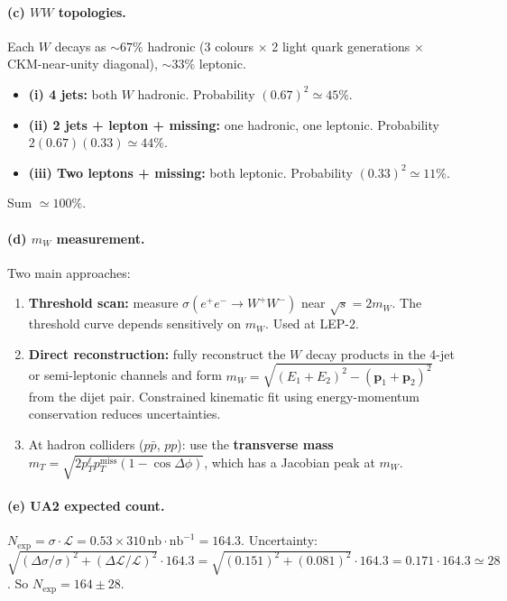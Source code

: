 \documentclass[11pt]{article}
\begin{document}
\paragraph{(c) $WW$ topologies.} Each $W$ decays as $\sim 67\%$ hadronic (3 colours $\times$ 2 light quark generations $\times$ CKM-near-unity diagonal), $\sim 33\%$ leptonic.

\begin{itemize}[itemsep=1pt]
\item \textbf{(i) 4 jets:} both $W$ hadronic. Probability $(0.67)^{2}\simeq 45\%$.
\item \textbf{(ii) 2 jets + lepton + missing:} one hadronic, one leptonic. Probability $2(0.67)(0.33)\simeq 44\%$.
\item \textbf{(iii) Two leptons + missing:} both leptonic. Probability $(0.33)^{2}\simeq 11\%$.
\end{itemize}
Sum $\simeq 100\%$. \checkmark

\paragraph{(d) $m_W$ measurement.} Two main approaches:
\begin{enumerate}[itemsep=1pt]
\item \textbf{Threshold scan:} measure $\sigma(e^+e^-\to W^+W^-)$ near $\sqrt{s}=2m_W$. The threshold curve depends sensitively on $m_W$. Used at LEP-2.
\item \textbf{Direct reconstruction:} fully reconstruct the $W$ decay products in the 4-jet or semi-leptonic channels and form $m_W=\sqrt{(E_1+E_2)^{2}-(\mathbf{p}_1+\mathbf{p}_2)^{2}}$ from the dijet pair. Constrained kinematic fit using energy-momentum conservation reduces uncertainties.
\item At hadron colliders ($p\bar p$, $pp$): use the \textbf{transverse mass} $m_T=\sqrt{2 p_T^\ell p_T^\mathrm{miss}(1-\cos\Delta\phi)}$, which has a Jacobian peak at $m_W$.
\end{enumerate}

\paragraph{(e) UA2 expected count.} $N_\mathrm{exp}=\sigma\cdot\mathcal{L}=0.53\times 310\,\mathrm{nb}\cdot\mathrm{nb}^{-1}=164.3$. Uncertainty: $\sqrt{(\Delta\sigma/\sigma)^{2}+(\Delta\mathcal{L}/\mathcal{L})^{2}}\cdot 164.3=\sqrt{(0.151)^{2}+(0.081)^{2}}\cdot 164.3=0.171\cdot 164.3\simeq 28$. So $N_\mathrm{exp}=164\pm 28$.
\end{document}
